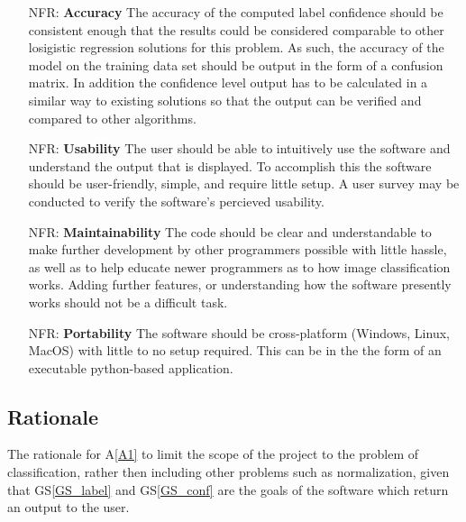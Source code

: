 \documentclass[12pt]{article}
\newcommand{\aref}[1]{A\ref{#1}}
\newcommand{\gsref}[1]{GS\ref{#1}}
\newcounter{nfrnum} %
\begin{document}
\noindent \begin{itemize}

\item[NFR\refstepcounter{nfrnum}\thenfrnum \label{NFR1}:]
  \textbf{Accuracy} The accuracy of the computed label confidence should be consistent enough that the results 
  could be considered comparable to other losigistic regression solutions for this problem. As such, the accuracy of the model
  on the training data set should be output in the form of a confusion matrix. In addition the confidence level output has to
  be calculated in a similar way to existing solutions so that the output can be verified and compared to other algorithms.

\item[NFR\refstepcounter{nfrnum}\thenfrnum \label{NFR2}:] \textbf{Usability}
  The user should be able to intuitively use the software and understand the output that is displayed.
  To accomplish this the software should be user-friendly, simple, and require little setup. A user survey
  may be conducted to verify the software's percieved usability.

\item[NFR\refstepcounter{nfrnum}\thenfrnum \label{NFR3}:]
  \textbf{Maintainability} The code should be clear and understandable to make further development by other programmers 
  possible with little hassle, as well as to help educate newer programmers as to how image classification works.
  Adding further features, or understanding how the software presently works should not be a difficult task.


\item[NFR\refstepcounter{nfrnum}\thenfrnum \label{NFR4}:]
  \textbf{Portability} The software should be cross-platform (Windows, Linux, MacOS) with little to no setup
  required. This can be in the the form of an executable python-based application.

\end{itemize}

\subsection{Rationale}

The rationale for \aref{A1} to limit the scope of the project to the problem of classification, rather then including
other problems such as normalization, given that \gsref{GS_label} and \gsref{GS_conf} are the goals of the software which return an output
to the user.
\end{document}
